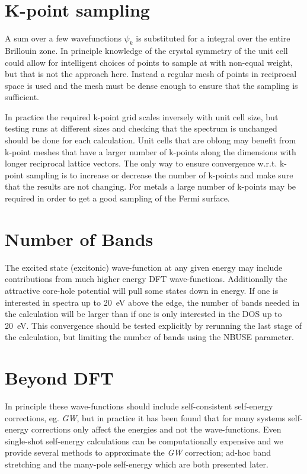 \documentclass[11pt]{report}
\begin{document}
\section{K-point sampling}

A sum over a few wavefunctions $\psi_k$ is substituted for a integral over the entire Brillouin zone. In principle knowledge of the crystal symmetry of the unit cell could allow for intelligent choices of  points to sample at with non-equal weight, but that is not the approach here. Instead a regular mesh of points in reciprocal space is used and the mesh must be dense enough to ensure that the sampling is sufficient. 

In practice the required k-point grid scales inversely with unit cell size, but testing runs at different sizes and checking that the spectrum is unchanged should be done for each calculation. Unit cells that are oblong may benefit from k-point meshes that have a larger number of k-points along the dimensions with longer reciprocal lattice vectors. The only way to ensure convergence w.r.t. k-point sampling is to increase or decrease the number of k-points and make sure that the results are not changing. For metals a large number of k-points may be required in order to get a good sampling of the Fermi surface.

\section{Number of Bands}

The excited state (excitonic) wave-function at any given energy may include contributions from much higher energy DFT wave-functions. Additionally the attractive core-hole potential will pull some states down in energy. If one is interested in spectra up to 20~eV above the edge, the number of bands needed in the calculation will be larger than if one is only interested in the DOS up to 20~eV. This convergence should be tested explicitly by rerunning the last stage of the calculation, but limiting the number of bands using the NBUSE parameter.

\section{Beyond DFT}

In principle these wave-functions should include self-consistent self-energy corrections, eg. {\it GW}, 
but in practice it has been found that for many systems 
self-energy corrections only affect the energies and not the wave-functions. 
Even single-shot self-energy calculations can be computationally expensive 
and we provide several methods to approximate the {\it GW} correction; 
ad-hoc band stretching and the many-pole self-energy which are both presented later.
\end{document}
